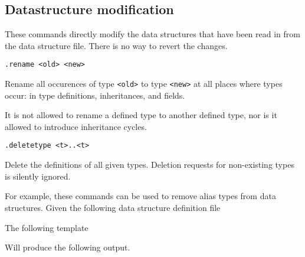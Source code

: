 \subsection{Datastructure modification}
These commands directly modify the data structures that have been
read in from the data structure file. There is no way to revert the
changes.
\begin{verbatim}
.rename <old> <new>
\end{verbatim}
\begin{desc}
Rename all occurences of type \verb'<old>' to type \verb'<new>' at
all places where types occur: in type definitions, inheritances,
and fields.

It is not allowed to rename a defined type to another defined type,
nor is it allowed to introduce inheritance cycles.
\end{desc}
\begin{verbatim}
.deletetype <t>..<t>
\end{verbatim}
\begin{desc}
Delete the definitions of all given types. Deletion requests for
non-existing types is silently ignored.
\end{desc}
For example, these commands can be used to remove alias types from
data structures. Given the following data structure definition file
\begin{showfile}

\end{showfile}
The following template
\begin{showfile}

\end{showfile}
Will produce the following output.
\begin{showfile}

\end{showfile}
